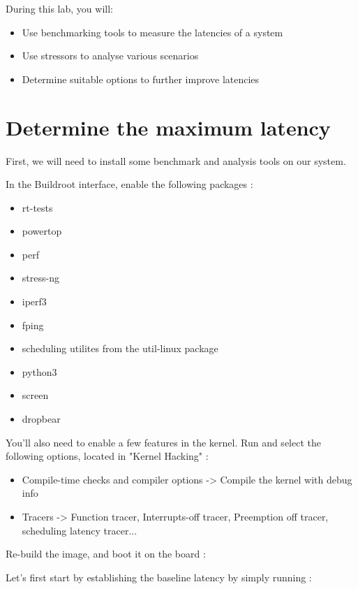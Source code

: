 
During this lab, you will:
\begin{itemize}
  \item Use benchmarking tools to measure the latencies of a system
  \item Use stressors to analyse various scenarios
  \item Determine suitable options to further improve latencies
\end{itemize}

\section{Determine the maximum latency}

First, we will need to install some benchmark and analysis tools on our system.

In the Buildroot  interface, enable the following packages :

\begin{itemize}
	\item rt-tests
	\item powertop
	\item perf
	\item stress-ng
	\item iperf3
	\item fping
	\item scheduling utilites from the util-linux package
	\item python3
	\item screen
	\item dropbear
\end{itemize}

You'll also need to enable a few features in the kernel. Run  and select
the following options, located in "Kernel Hacking" :

\begin{itemize}
	\item Compile-time checks and compiler options -> Compile the kernel with debug info
	\item Tracers -> Function tracer, Interrupts-off tracer, Preemption off tracer, scheduling latency tracer...
\end{itemize}

Re-build the image, and boot it on the board : 

Let's first start by establishing the baseline latency by simply running  :

